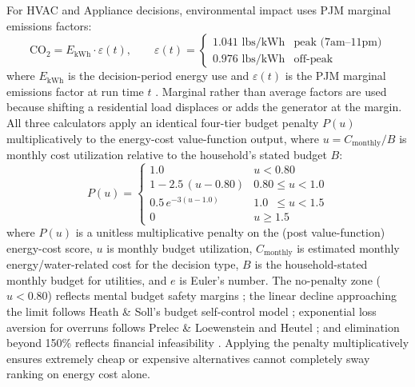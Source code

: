\documentclass[final,3p,times]{elsarticle}
\begin{document}
For HVAC and Appliance decisions, environmental impact uses PJM marginal emissions factors:
\begin{equation}
  \mathrm{CO_2} = E_{\mathrm{kWh}} \cdot \varepsilon(t), \qquad
  \varepsilon(t) = \begin{cases}
    1.041 \text{ lbs/kWh} & \text{peak (7am--11pm)} \\
    0.976 \text{ lbs/kWh} & \text{off-peak}
  \end{cases}
  \label{eq:emissions}
\end{equation}
\noindent where $E_{\mathrm{kWh}}$ is the decision-period energy use and $\varepsilon(t)$ is the PJM marginal emissions factor at run time $t$ \cite{pjm2022emissions}. Marginal rather than average factors are used because shifting a residential load displaces or adds the generator at the margin.
All three calculators apply an identical four-tier budget penalty $P(u)$ multiplicatively to the energy-cost value-function output, where $u = C_{\mathrm{monthly}} / B$ is monthly cost utilization relative to the household's stated budget $B$:
\begin{equation}
  P(u) = \begin{cases}
    1.0                          & u < 0.80                   \\[4pt]
    1 - 2.5\,(u - 0.80)         & 0.80 \le u < 1.0           \\[4pt]
    0.5\,e^{-3(u - 1.0)}        & 1.0 \phantom{0}\le u < 1.5 \\[4pt]
    0                            & u \ge 1.5
  \end{cases}
  \label{eq:budget_penalty}
\end{equation}
\noindent where $P(u)$ is a unitless multiplicative penalty on the (post value-function) energy-cost score, $u$ is monthly budget utilization, $C_{\mathrm{monthly}}$ is estimated monthly energy/water-related cost for the decision type, $B$ is the household-stated monthly budget for utilities, and $e$ is Euler's number.
\noindent The no-penalty zone ($u < 0.80$) reflects mental budget safety margins \cite{thaler1999}; the linear decline approaching the limit follows Heath \& Soll's budget self-control model \cite{heath1996}; exponential loss aversion for overruns follows Prelec \& Loewenstein \cite{prelec1998} and Heutel \cite{heutel2017}; and elimination beyond 150\% reflects financial infeasibility \cite{gathergood2012}. Applying the penalty multiplicatively ensures extremely cheap or expensive alternatives cannot completely sway ranking on energy cost alone.
\end{document}
